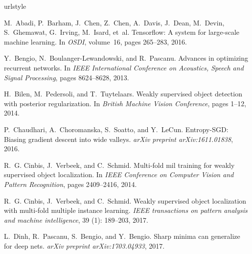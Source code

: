 \documentclass{bmvc2k}
\begin{document}
\begin{thebibliography}{33}
\providecommand{\natexlab}[1]{#1}
\providecommand{\url}[1]{\texttt{#1}}
\expandafter\ifx\csname urlstyle\endcsname\relax
  \providecommand{\doi}[1]{doi: #1}\else
  \providecommand{\doi}{doi: \begingroup \urlstyle{rm}\Url}\fi

M.~Abadi, P.~Barham, J.~Chen, Z.~Chen, A.~Davis, J.~Dean, M.~Devin,
  S.~Ghemawat, G.~Irving, M.~Isard, et~al.
\newblock Tensorflow: A system for large-scale machine learning.
\newblock In \emph{OSDI}, volume~16, pages 265--283, 2016.

Y.~Bengio, N.~Boulanger-Lewandowski, and R.~Pascanu.
\newblock Advances in optimizing recurrent networks.
\newblock In \emph{IEEE International Conference on Acoustics, Speech and
  Signal Processing}, pages 8624--8628, 2013.

H.~Bilen, M.~Pedersoli, and T.~Tuytelaars.
\newblock Weakly supervised object detection with posterior regularization.
\newblock In \emph{British Machine Vision Conference}, pages 1--12, 2014.

P.~Chaudhari, A.~Choromanska, S.~Soatto, and Y.~LeCun.
\newblock Entropy-{SGD}: Biasing gradient descent into wide valleys.
\newblock \emph{arXiv preprint arXiv:1611.01838}, 2016.

R.~G. Cinbis, J.~Verbeek, and C.~Schmid.
\newblock Multi-fold mil training for weakly supervised object localization.
\newblock In \emph{IEEE Conference on Computer Vision and Pattern Recognition},
  pages 2409--2416, 2014.

R.~G. Cinbis, J.~Verbeek, and C.~Schmid.
\newblock Weakly supervised object localization with multi-fold multiple
  instance learning.
\newblock \emph{IEEE transactions on pattern analysis and machine
  intelligence}, 39 (1): 189--203, 2017.

L.~Dinh, R.~Pascanu, S.~Bengio, and Y.~Bengio.
\newblock Sharp minima can generalize for deep nets.
\newblock \emph{arXiv preprint arXiv:1703.04933}, 2017.


\end{thebibliography}
\end{document}
